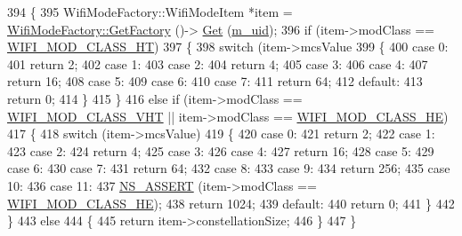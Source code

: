 \begin{DoxyCode}
394 \{
395   WifiModeFactory::WifiModeItem *item = \hyperlink{classns3_1_1WifiModeFactory_a9c6f695d733355dee8d74bd1709868fc}{WifiModeFactory::GetFactory} ()->
      \hyperlink{classns3_1_1WifiModeFactory_a3086868810ff4347e31c63027726f544}{Get} (\hyperlink{classns3_1_1WifiMode_ad63e4633ba59d019abfb07de0858727f}{m\_uid});
396   \textcolor{keywordflow}{if} (item->modClass == \hyperlink{namespacens3_aa999e1221606a2b21b1eb33c2007c217a6ac45cac36cc4454649435d24ebf349c}{WIFI\_MOD\_CLASS\_HT})
397     \{
398       \textcolor{keywordflow}{switch} (item->mcsValue %
399         \{
400         \textcolor{keywordflow}{case} 0:
401           \textcolor{keywordflow}{return} 2;
402         \textcolor{keywordflow}{case} 1:
403         \textcolor{keywordflow}{case} 2:
404           \textcolor{keywordflow}{return} 4;
405         \textcolor{keywordflow}{case} 3:
406         \textcolor{keywordflow}{case} 4:
407           \textcolor{keywordflow}{return} 16;
408         \textcolor{keywordflow}{case} 5:
409         \textcolor{keywordflow}{case} 6:
410         \textcolor{keywordflow}{case} 7:
411           \textcolor{keywordflow}{return} 64;
412         \textcolor{keywordflow}{default}:
413           \textcolor{keywordflow}{return} 0;
414         \}
415     \}
416   \textcolor{keywordflow}{else} \textcolor{keywordflow}{if} (item->modClass == \hyperlink{namespacens3_aa999e1221606a2b21b1eb33c2007c217a9863e4342bf5c238c74dddfc4d96c67e}{WIFI\_MOD\_CLASS\_VHT} || item->modClass == 
      \hyperlink{namespacens3_aa999e1221606a2b21b1eb33c2007c217abfa4f7272510045a9b43e8ac27ac13b0}{WIFI\_MOD\_CLASS\_HE})
417     \{
418       \textcolor{keywordflow}{switch} (item->mcsValue)
419         \{
420         \textcolor{keywordflow}{case} 0:
421           \textcolor{keywordflow}{return} 2;
422         \textcolor{keywordflow}{case} 1:
423         \textcolor{keywordflow}{case} 2:
424           \textcolor{keywordflow}{return} 4;
425         \textcolor{keywordflow}{case} 3:
426         \textcolor{keywordflow}{case} 4:
427           \textcolor{keywordflow}{return} 16;
428         \textcolor{keywordflow}{case} 5:
429         \textcolor{keywordflow}{case} 6:
430         \textcolor{keywordflow}{case} 7:
431           \textcolor{keywordflow}{return} 64;
432         \textcolor{keywordflow}{case} 8:
433         \textcolor{keywordflow}{case} 9:
434           \textcolor{keywordflow}{return} 256;
435         \textcolor{keywordflow}{case} 10:
436         \textcolor{keywordflow}{case} 11:
437           \hyperlink{assert_8h_a6dccdb0de9b252f60088ce281c49d052}{NS\_ASSERT} (item->modClass == \hyperlink{namespacens3_aa999e1221606a2b21b1eb33c2007c217abfa4f7272510045a9b43e8ac27ac13b0}{WIFI\_MOD\_CLASS\_HE});
438           \textcolor{keywordflow}{return} 1024;
439         \textcolor{keywordflow}{default}:
440           \textcolor{keywordflow}{return} 0;
441         \}
442     \}
443   \textcolor{keywordflow}{else}
444     \{
445       \textcolor{keywordflow}{return} item->constellationSize;
446     \}
447 \}
\end{DoxyCode}


